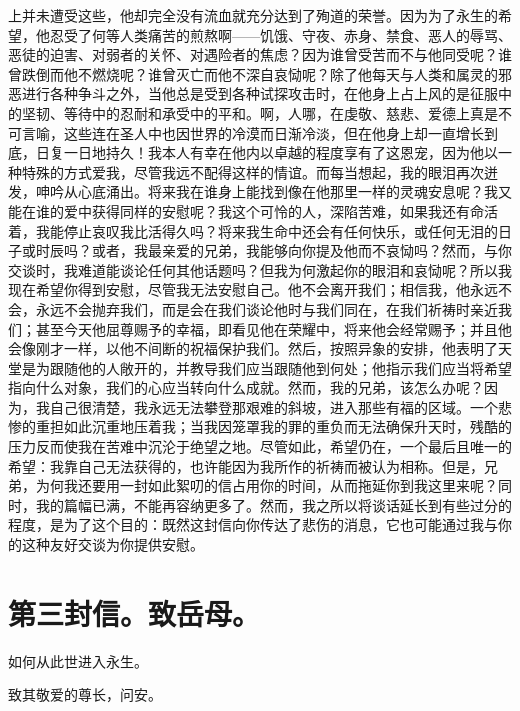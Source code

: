上并未遭受这些，他却完全没有流血就充分达到了殉道的荣誉。因为为了永生的希望，他忍受了何等人类痛苦的煎熬啊——饥饿、守夜、赤身、禁食、恶人的辱骂、恶徒的迫害、对弱者的关怀、对遇险者的焦虑？因为谁曾受苦而不与他同受呢？谁曾跌倒而他不燃烧呢？谁曾灭亡而他不深自哀恸呢？除了他每天与人类和属灵的邪恶进行各种争斗之外，当他总是受到各种试探攻击时，在他身上占上风的是征服中的坚韧、等待中的忍耐和承受中的平和。啊，人哪，在虔敬、慈悲、爱德上真是不可言喻，这些连在圣人中也因世界的冷漠而日渐冷淡，但在他身上却一直增长到底，日复一日地持久！我本人有幸在他内以卓越的程度享有了这恩宠，因为他以一种特殊的方式爱我，尽管我远不配得这样的情谊。而每当想起，我的眼泪再次迸发，呻吟从心底涌出。将来我在谁身上能找到像在他那里一样的灵魂安息呢？我又能在谁的爱中获得同样的安慰呢？我这个可怜的人，深陷苦难，如果我还有命活着，我能停止哀叹我比活得久吗？将来我生命中还会有任何快乐，或任何无泪的日子或时辰吗？或者，我最亲爱的兄弟，我能够向你提及他而不哀恸吗？然而，与你交谈时，我难道能谈论任何其他话题吗？但我为何激起你的眼泪和哀恸呢？所以我现在希望你得到安慰，尽管我无法安慰自己。他不会离开我们；相信我，他永远不会，永远不会抛弃我们，而是会在我们谈论他时与我们同在，在我们祈祷时亲近我们；甚至今天他屈尊赐予的幸福，即看见他在荣耀中，将来他会经常赐予；并且他会像刚才一样，以他不间断的祝福保护我们。然后，按照异象的安排，他表明了天堂是为跟随他的人敞开的，并教导我们应当跟随他到何处；他指示我们应当将希望指向什么对象，我们的心应当转向什么成就。然而，我的兄弟，该怎么办呢？因为，我自己很清楚，我永远无法攀登那艰难的斜坡，进入那些有福的区域。一个悲惨的重担如此沉重地压着我；当我因笼罩我的罪的重负而无法确保升天时，残酷的压力反而使我在苦难中沉沦于绝望之地。尽管如此，希望仍在，一个最后且唯一的希望：我靠自己无法获得的，也许能因为我所作的祈祷而被认为相称。但是，兄弟，为何我还要用一封如此絮叨的信占用你的时间，从而拖延你到我这里来呢？同时，我的篇幅已满，不能再容纳更多了。然而，我之所以将谈话延长到有些过分的程度，是为了这个目的：既然这封信向你传达了悲伤的消息，它也可能通过我与你的这种友好交谈为你提供安慰。\par


\section{第三封信。致岳母。}

如何从此世进入永生。\par

致其敬爱的尊长，问安。\par


